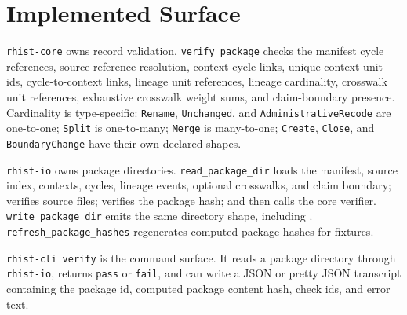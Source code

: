 \section{Implemented Surface}

\texttt{rhist-core} owns record validation. \texttt{verify\_package} checks the
manifest cycle references, source reference resolution, context cycle links,
unique context unit ids, cycle-to-context links, lineage unit references,
lineage cardinality, crosswalk unit references, exhaustive crosswalk weight
sums, and claim-boundary presence. Cardinality is type-specific:
\texttt{Rename}, \texttt{Unchanged}, and \texttt{AdministrativeRecode} are
one-to-one; \texttt{Split} is one-to-many; \texttt{Merge} is many-to-one;
\texttt{Create}, \texttt{Close}, and \texttt{BoundaryChange} have their own
declared shapes.

\texttt{rhist-io} owns package directories. \texttt{read\_package\_dir} loads
the manifest, source index, contexts, cycles, lineage events, optional
crosswalks, and claim boundary; verifies source files; verifies the package
hash; and then calls the core verifier. \texttt{write\_package\_dir} emits the
same directory shape, including .
\texttt{refresh\_package\_hashes} regenerates computed package hashes for
fixtures.

\texttt{rhist-cli verify} is the command surface. It reads a package directory
through \texttt{rhist-io}, returns \texttt{pass} or \texttt{fail}, and can write
a JSON or pretty JSON transcript containing the package id, computed package
content hash, check ids, and error text.

